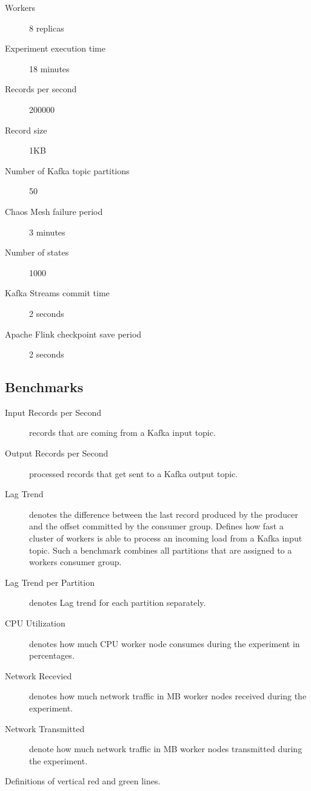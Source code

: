 \begin{description}
    \item[Workers] 8 replicas
    \item[Experiment execution time] 18 minutes
    \item[Records per second] 200000
    \item[Record size] 1KB
    \item[Number of Kafka topic partitions] 50
    \item[Chaos Mesh failure period] 3 minutes
    \item[Number of states] 1000
    \item[Kafka Streams commit time] 2 seconds
    \item[Apache Flink checkpoint save period] 2 seconds
\end{description}



\subsection{Benchmarks}\label{subsec:definition-of-benchmarks}

\begin{description}
    \item[Input Records per Second] records that are coming from a Kafka input topic.
    \item[Output Records per Second] processed records that get sent to a Kafka output topic.
    \item[Lag Trend] denotes the difference between the last record produced by the producer and the offset committed by the consumer group.
    Defines how fast a cluster of workers is able to process an incoming load from a Kafka input topic.
    Such a benchmark combines all partitions that are assigned to a workers consumer group.
    \item[Lag Trend per Partition] denotes Lag trend for each partition separately.
    \item[CPU Utilization] denotes how much CPU worker node consumes during the experiment in percentages.
    \item[Network Recevied] denotes how much network traffic in MB worker nodes received during the experiment.
    \item[Network Transmitted] denote how much network traffic in MB worker nodes transmitted during the experiment.
\end{description}

Definitions of vertical red and green lines.


